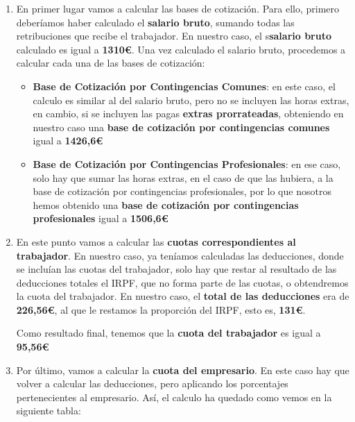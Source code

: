 \begin{enumerate}[label=\alph*)]
    \item En primer lugar vamos a calcular las bases de cotización. Para ello, primero deberíamos haber calculado el \textbf{salario bruto}, sumando todas las retribuciones que recibe el trabajador. En nuestro caso, el s\textbf{salario bruto} calculado es igual a \textbf{1310€}. Una vez calculado el salario bruto, procedemos a calcular cada una de las bases de cotización:

    \begin{itemize}
        \item \textbf{Base de Cotización por Contingencias Comunes}: en este caso, el calculo es similar al del salario bruto, pero no se incluyen las horas extras, en cambio, si se incluyen las pagas \textbf{extras prorrateadas}, obteniendo en nuestro caso una \textbf{base de cotización por contingencias comunes} igual a \textbf{1426,6€}

        \item \textbf{Base de Cotización por Contingencias Profesionales}: en ese caso, solo hay que sumar las horas extras, en el caso de que las hubiera, a la base de cotización por contingencias profesionales, por lo que nosotros hemos obtenido una \textbf{base de cotización por contingencias profesionales} igual a \textbf{1506,6€}
    \end{itemize}

    \item En este punto vamos a calcular las \textbf{cuotas correspondientes al trabajador}. En nuestro caso, ya teníamos calculadas las deducciones, donde se incluían las cuotas del trabajador, solo hay que restar al resultado de las deducciones totales el IRPF, que no forma parte de las cuotas, o obtendremos la cuota del trabajador. En nuestro caso, el \textbf{total de las deducciones} era de \textbf{226,56€}, al que le restamos la proporción del IRPF, esto es, \textbf{131€}.

    Como resultado final, tenemos que la \textbf{cuota del trabajador} es igual a \textbf{95,56€}

    \item Por último, vamos a calcular la \textbf{cuota del empresario}. En este caso hay que volver a calcular las deducciones, pero aplicando los porcentajes pertenecientes al empresario. Así, el calculo ha quedado como vemos en la siguiente tabla:

    \begin{figure}[H]


\end{figure}
\end{enumerate}
